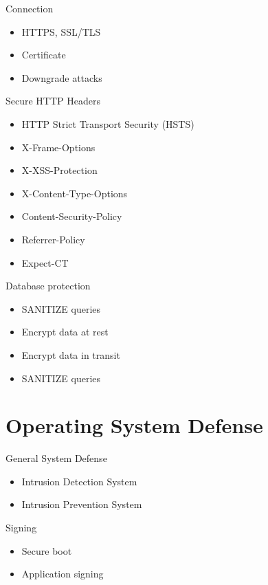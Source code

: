\documentclass{curs}
\begin{document}
\begin{frame}{Connection}
  \begin{itemize}
    \item HTTPS, SSL/TLS
    \item Certificate
    \item Downgrade attacks
  \end{itemize}
\end{frame}

\begin{frame}{Secure HTTP Headers}
  \begin{itemize}
    \item HTTP Strict Transport Security (HSTS)
    \item X-Frame-Options
    \item X-XSS-Protection
    \item X-Content-Type-Options
    \item Content-Security-Policy
    \item Referrer-Policy
    \item Expect-CT
  \end{itemize}
\end{frame}

\begin{frame}{Database protection}
  \begin{itemize}
    \item SANITIZE queries
    \item Encrypt data at rest
    \item Encrypt data in transit
    \item SANITIZE queries
  \end{itemize}
\end{frame}


\section{Operating System Defense}

\begin{frame}{General System Defense}
  \begin{itemize}
    \item Intrusion Detection System
    \item Intrusion Prevention System
  \end{itemize}
\end{frame}

\begin{frame}{Signing}
  \begin{itemize}
    \item Secure boot
    \item Application signing
  \end{itemize}
\end{frame}
\end{document}
